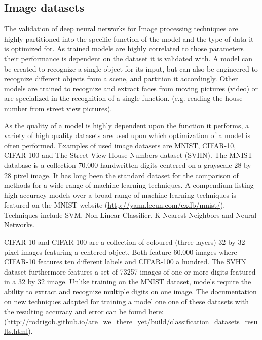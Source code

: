 \subsection{Image datasets \label{subsec:imdata}}
The validation of deep neural networks for Image processing techniques are highly partitioned into the specific function of the model and the type of data it is optimized for. As trained models are highly correlated to those parameters their performance is dependent on the dataset it is validated with. A model can be created to recognize a single object for its input, but can also be engineered to recognize different objects from a scene, and partition it accordingly. Other models are trained to recognize and extract faces from moving pictures (video) or are specialized in the recognition of a single function. (e.g. reading the house number from street view pictures). 


As the quality of a model is highly dependent upon the function it performs, a variety of high quality datasets are used upon which optimization of a model is often performed. Examples of used image datasets are MNIST, CIFAR-10, CIFAR-100 and The Street View House Numbers dataset (SVHN). The MNIST database is a collection 70.000 handwritten digits centered on a grayscale 28 by 28 pixel image.  It has long been the standard dataset for the comparison of methods for a wide range of machine learning techniques. A compendium listing high accuracy models over a broad range of machine learning techniques is featured on the MNIST website (\url{http://yann.lecun.com/exdb/mnist/}). Techniques include SVM, Non-Linear Classifier, K-Nearest Neighbors and Neural Networks. 

CIFAR-10 and CIFAR-100 are a collection of coloured (three layers) 32 by 32 pixel images featuring a centered object.  Both feature 60.000 images where CIFAR-10 features ten different labels and CIFAR-100 a hundred. The SVHN dataset furthermore features a set of 73257 images of one or more digits featured in a 32 by 32 image. Unlike training on the MNIST dataset, models require the ability to extract and recognize multiple digits on one image. The documentation on new techniques adapted for training a model one one of these datasets with the resulting accuracy and error can be found here:   (\url{http://rodrigob.github.io/are_we_there_yet/build/classification_datasets_results.html}).



